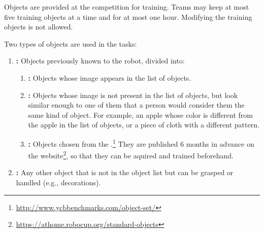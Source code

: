 Objects are provided at the competition for training.
Teams may keep at most five training objects at a time and for at most one hour.
Modifying the training objects is not allowed.

Two types of objects are used in the tasks:
\begin{enumerate}
	\item \textbf{\KnownObjects{}:} Objects previously known to the robot, divided into:
	\begin{enumerate}
		\item \textbf{\ConsistentObjects{}:} Objects whose image appears in the list of objects.
		\item \textbf{\SimilarObjects{}:} Objects whose image is not present in the list of objects, but look similar enough to one of them that a person would consider them the same kind of object. For example, an apple whose color is different from the apple in the list of objects, or a piece of cloth with a different pattern.
		\item \textbf{\StandardObjects{}:} Objects chosen from the \YCBData{}.\footnote{\url{http://www.ycbbenchmarks.com/object-set/}} They are published 6 months in advance on the \RoboCup\AtHome{} website\footnote{\url{https://athome.robocup.org/standard-objects}}, so that they can be aquired and trained beforehand.
	\end{enumerate}
	\item \textbf{\UnknownObjects{}:} Any other object that is not in the object list but can be grasped or handled (e.g., \Arena{} decorations).
\end{enumerate}

